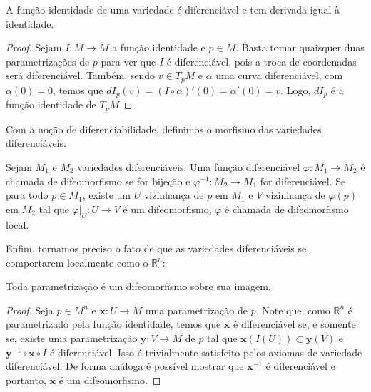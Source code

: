 	\begin{example}
		\label{ex:identidade-diferenciavel}
		A função identidade de uma variedade é diferenciável e tem derivada igual à identidade.
		\begin{proof}

			Sejam $I:M\to M$ a função identidade e $p \in M$. Basta tomar quaisquer duas parametrizações de $p$ para ver que $I$ é diferenciável, pois a troca de coordenadas será diferenciável. Também, sendo $v \in T_{p}M$ e $\alpha$ uma curva diferenciável, com $\alpha(0)=0$, temos que $dI_{p}(v)=(I \circ\alpha)'(0)=\alpha'(0)=v$. Logo, $dI_{p}$ é a função identidade de $T_{p}M$
		\end{proof}
	\end{example}
	Com a noção de diferenciabilidade, definimos o morfismo das variedades diferenciáveis:
	\begin{definition}
		\label{def:difeomorfismo}
		Sejam $M_{1}$ e $M_{2}$ variedades diferenciáveis. Uma função diferenciável $\varphi:M_{1} \to M_{2}$ é chamada de difeomorfismo se for bijeção e $\varphi ^{-1}:M_{2}\to M_{1}$ for diferenciável.
		Se para todo $p \in M_{1}$, existe um $U$ vizinhança de $p$ em $M_{1}$ e $V$ vizinhança de $\varphi(p)$ em $M_{2}$ tal que $\varphi|_{U}:U\to V$ é um difeomorfismo, $\varphi$ é chamada de difeomorfismo local.
	\end{definition}
	Enfim, tornamos preciso o fato de que as variedades diferenciáveis se comportarem localmente como o $\mathbb{R}^{n}$:
	\begin{proposition}
		\label{prop:parametrizacao-difeomorfismo}
		Toda parametrização é um difeomorfismo sobre sua imagem.
		\begin{proof}

			Seja $p \in M^{n}$ e $\mathbf{x}:U\to M$ uma parametrização de $p$. Note que, como $\mathbb{R}^{n}$ é parametrizado pela função identidade, temos que $\mathbf{x}$ é diferenciável se, e somente se, existe uma parametrização $\mathbf{y}:V\to M$ de $p$ tal que $\mathbf{x}(I(U)) \subset \mathbf{y}(V)$ e $\mathbf{y}^{-1} \circ \mathbf{x} \circ I$ é diferenciável. Isso é trivialmente satisfeito pelos axiomas de variedade diferenciável.
			De forma análoga é possível mostrar que $\mathbf{x}^{-1}$ é diferenciável e portanto, $\mathbf{x}$ é um difeomorfismo.
		\end{proof}
	\end{proposition}
